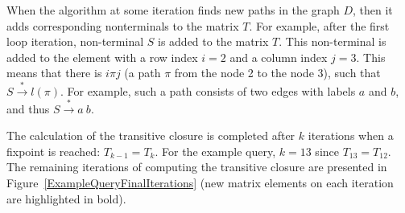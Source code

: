When the algorithm at some iteration finds new paths in the graph $D$, then it adds corresponding nonterminals to the matrix $T$. For example, after the first loop iteration, non-terminal $S$ is added to the matrix $T$. This non-terminal is added to the element with a row index $i = 2$ and a column index $j = 3$. This means that there is $i\pi j$ (a path $\pi$ from the node 2 to the node 3), such that $S \xrightarrow{*} l(\pi)$. For example, such a path consists of two edges with labels $a$ and $b$, and thus $S \xrightarrow{*} a \ b$.

The calculation of the transitive closure is completed after $k$ iterations when a fixpoint is reached: $T_{k-1} = T_k$. For the example query, $k = 13$ since $T_13 = T_12$. The remaining iterations of computing the transitive closure are presented in Figure~\ref{ExampleQueryFinalIterations} (new matrix elements on each iteration are highlighted in bold).

